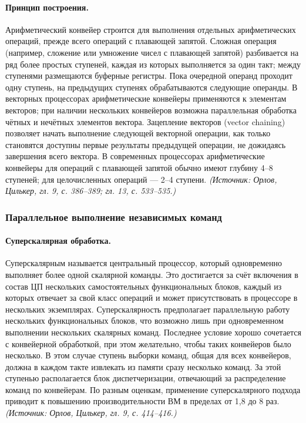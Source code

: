 \documentclass[a4paper,12pt]{article}
\begin{document}
\paragraph{Принцип построения.}
Арифметический конвейер строится для выполнения отдельных арифметических операций, прежде всего операций с плавающей запятой. Сложная операция (например, сложение или умножение чисел с плавающей запятой) разбивается на ряд более простых ступеней, каждая из которых выполняется за один такт; между ступенями размещаются буферные регистры. Пока очередной операнд проходит одну ступень, на предыдущих ступенях обрабатываются следующие операнды. В векторных процессорах арифметические конвейеры применяются к элементам векторов; при наличии нескольких конвейеров возможна параллельная обработка чётных и нечётных элементов вектора. Зацепление векторов (vector chaining) позволяет начать выполнение следующей векторной операции, как только становятся доступны первые результаты предыдущей операции, не дожидаясь завершения всего вектора. В современных процессорах арифметические конвейеры для операций с плавающей запятой обычно имеют глубину 4--8 ступеней; для целочисленных операций --- 2--4 ступени.
\textit{(Источник: Орлов, Цилькер, гл. 9, с. 386--389; гл. 13, с. 533--535.)}

\subsubsection{Параллельное выполнение независимых команд}

\paragraph{Суперскалярная обработка.}
Суперскалярным называется центральный процессор, который одновременно выполняет более одной скалярной команды. Это достигается за счёт включения в состав ЦП нескольких самостоятельных функциональных блоков, каждый из которых отвечает за свой класс операций и может присутствовать в процессоре в нескольких экземплярах. Суперскалярность предполагает параллельную работу нескольких функциональных блоков, что возможно лишь при одновременном выполнении нескольких скалярных команд. Последнее условие хорошо сочетается с конвейерной обработкой, при этом желательно, чтобы таких конвейеров было несколько. В этом случае ступень выборки команд, общая для всех конвейеров, должна в каждом такте извлекать из памяти сразу несколько команд. За этой ступенью располагается блок диспетчеризации, отвечающий за распределение команд по конвейерам. По разным оценкам, применение суперскалярного подхода приводит к повышению производительности ВМ в пределах от 1,8 до 8 раз.
\textit{(Источник: Орлов, Цилькер, гл. 9, с. 414--416.)}
\end{document}
